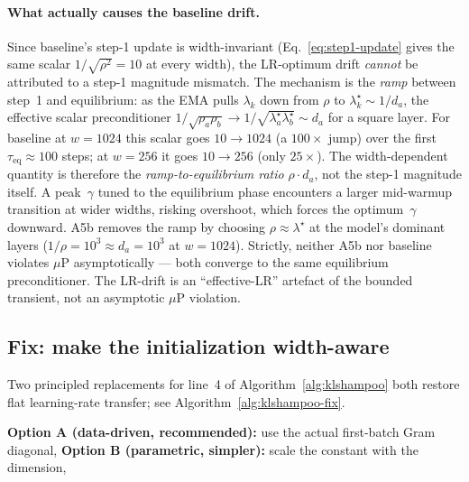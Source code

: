 \paragraph{What actually causes the baseline drift.}
Since baseline's step-1 update is width-invariant
(Eq.~\eqref{eq:step1-update} gives the same scalar $1/\sqrt{\rho^2}{=}10$
at every width), the LR-optimum drift \emph{cannot} be attributed to a
step-1 magnitude mismatch. The mechanism is the \emph{ramp} between
step~1 and equilibrium: as the EMA pulls $\lambda_k$ down from $\rho$ to
$\lambda_k^\star\!\sim\! 1/d_a$, the effective scalar preconditioner
$1/\sqrt{\rho_a\rho_b}{\to}1/\sqrt{\lambda_a^\star \lambda_b^\star}\!\sim\!
d_a$ for a square layer. For baseline at $w{=}1024$ this scalar goes
$10{\to}1024$ (a $100\!\times$ jump) over the first
$\tau_\mathrm{eq}\!\approx\!100$ steps; at $w{=}256$ it goes $10{\to}256$
(only $25\!\times$). The width-dependent quantity is therefore the
\emph{ramp-to-equilibrium ratio} $\rho \cdot d_a$, not the step-1
magnitude itself. A peak~$\gamma$ tuned to the equilibrium phase
encounters a larger mid-warmup transition at wider widths, risking
overshoot, which forces the optimum~$\gamma$ downward. A5b removes the
ramp by choosing $\rho\!\approx\!\lambda^\star$ at the model's dominant
layers ($1/\rho{=}10^3 \approx d_a{=}10^3$ at $w{=}1024$).
Strictly, neither A5b nor baseline violates $\mu$P asymptotically --- both
converge to the same equilibrium preconditioner. The LR-drift is an
``effective-LR'' artefact of the bounded transient, not an asymptotic
$\mu$P violation.

\subsection{Fix: make the initialization width-aware}
\label{sec:klshampoo-init-fix}

Two principled replacements for line~4 of Algorithm~\ref{alg:klshampoo}
both restore flat learning-rate transfer; see Algorithm~\ref{alg:klshampoo-fix}.

\begin{algorithm}[t]
\caption{Two width-aware initializations for $\lambda_k(0)$. Replace line~4
of Algorithm~\ref{alg:klshampoo} with one of the lines in .}
\label{alg:klshampoo-fix}
\begin{algorithmic}[1]
  \State \textbf{Option A (data-driven, recommended):}
         use the actual first-batch Gram diagonal,
  \State {}
  \Statex
  \State \textbf{Option B (parametric, simpler):}
         scale the constant with the dimension,
  \State {}
\end{algorithmic}
\end{algorithm}

